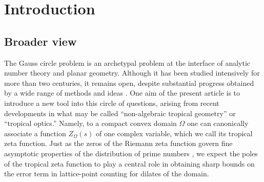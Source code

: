 \documentclass[a4paper,american,11pt]{amsart}
\theoremstyle{plain}
\theoremstyle{definition}
\begin{document}
\begin{abstract}
Finally, we study the parabolic domain
\[
L=\{(x,y)\in\mathbb{R}^2:
\sqrt{1-|x|}+\sqrt{1-|y|}\geq1\}.
\]
Its tropical zeta function is explicitly expressible through Witten's
\(\mathrm{SU}(3)\) zeta function, and \(L\) is the deterministic limit
shape for convex lattice polygons in the square. The same Farey cells carry
the cubic weights \(m_{p,q}=pq(p+q)\) governing \(Z_L(s)\). In the exact
head--tail decomposition of the averaged lattice-point count, the apparent
\(N^{2/3}\) contribution from the pole at \(s=\frac23\) cancels against
explicit arithmetic corrections from the rational tropical coefficients.
The first surviving term is
\[
N^{-3/2}\sum_{n\leq N}
\left(
|nL\cap\mathbb{Z}^2|-\frac{10}{3}n^2
\right)
\longrightarrow
\frac{32}{3}\zeta\!\left(-\frac12\right)
\frac{\zeta(2)}{\zeta(3)}.
\]
Thus, for \(L\), one Farey decomposition determines the Witten
\(\mathrm{SU}(3)\) expression for \(Z_L\), its equiaffine residue, and the
first surviving averaged lattice-point fluctuation.
\end{abstract}

\maketitle
\newpage
\tableofcontents

\section{Introduction}

\subsection{Broader view}\label{sec1.1}

The Gauss circle problem \cite{gauss1826nexu} is an archetypal problem at
the interface of analytic number theory and planar geometry. Although it has
been studied intensively for more than two centuries, it remains open, despite
substantial progress obtained by a wide range of methods and ideas
\cite{BerndtKimZaharescu2018}. One aim of the present article is to introduce
a new tool into this circle of questions, arising from recent developments in
what may be called ``non-algebraic tropical geometry'' or ``tropical optics.''
Namely, to a compact convex domain \(\Omega\) one can canonically associate a
function \(Z_\Omega(s)\) of one complex variable, which we call its tropical
zeta function. Just as the zeros of the Riemann zeta function govern fine
asymptotic properties of the distribution of prime numbers
\cite{Riemann1859,MazurStein2016}, we expect the poles of the tropical zeta
function to play a central role in obtaining sharp bounds on the error term in
lattice-point counting for dilates of the domain.
\end{document}
